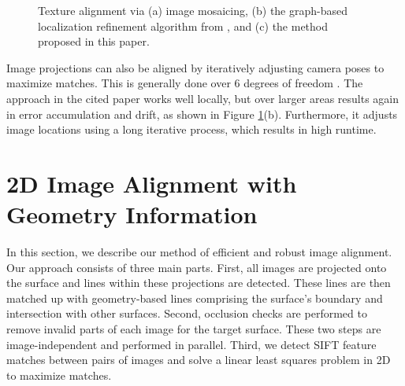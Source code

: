 \documentclass[]{spie}  %
\begin{document}
\begin{figure}
  \centering

  \centering

  \centering

  \caption{Texture alignment via (a) image mosaicing, (b) the
    graph-based localization refinement algorithm from
    \cite{chen2010indoor}, and (c) the method proposed in this paper.}
  \label{fig:mosaic3D}
\end{figure}

Image projections can also be aligned by iteratively adjusting camera
poses to maximize matches. This is generally done over 6 degrees of
freedom \cite{liu2010indoor}. The approach in the cited paper works
well locally, but over larger areas results again in error
accumulation and drift, as shown in Figure
\ref{fig:mosaic3D}(b). Furthermore, it adjusts image locations using
a long iterative process, which results in high runtime.


\section{2D Image Alignment with Geometry Information}
\label{sec:2dAlignment}
In this section, we describe our method of efficient and robust image
alignment. Our approach consists of three main parts. First, all
images are projected onto the surface and lines within these
projections are detected. These lines are then matched up with
geometry-based lines comprising the surface's boundary and
intersection with other surfaces. Second, occlusion checks are
performed to remove invalid parts of each image for the target
surface. These two steps are image-independent and performed in
parallel. Third, we detect SIFT feature matches between pairs of
images and solve a linear least squares problem in 2D to maximize
matches.
\end{document}
